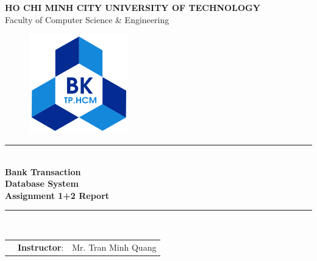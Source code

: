 \documentclass[12pt,a4paper]{article}
\newcommand\HRule{\rule{12cm}{1pt}}
\begin{document}
\begin{titlepage}

  \begin{center}

    \textbf{\fontsize{12pt}{1pt}\selectfont HO CHI MINH CITY UNIVERSITY OF TECHNOLOGY}\\[0.5cm]
    {\fontsize{13pt}{1pt}\selectfont Faculty of Computer Science \& Engineering}\\[0.5cm]
    \begin{figure}[H]
      \centering
      \includegraphics[width=1.7in,height=1.7in]{hcmut.png}
    \end{figure}

    \HRule\\[0.5cm]
    { \textbf{\fontsize{25pt}{1pt}\selectfont Bank Transaction }}\\[0.6 cm]
    { \textbf{\fontsize{25pt}{1pt}\selectfont Database System}}\\[0.6 cm]
    { \textbf{\fontsize{25pt}{1pt}\selectfont Assignment 1+2 Report}}\\[0.4cm]

    \HRule\\[0.8cm]
    
\vspace{0.5cm}

\begin{table}[h]
\begin{tabular}{rrl}
\hspace{2.8 cm} & \textbf{Instructor}: & Mr. Tran Minh Quang\\
\end{tabular}
\end{table}


\end{center}
\end{titlepage}
\end{document}
